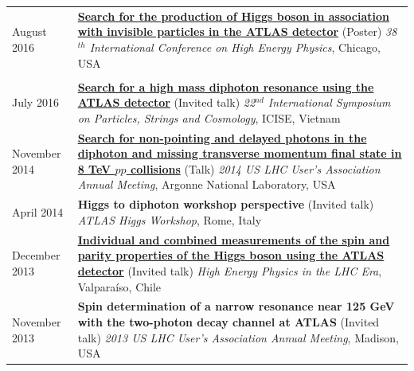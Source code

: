 \documentclass{letter}
\begin{document}
\begin{tabular}{p{}p{}}
	August 2016
	&
	\href{https://cds.cern.ch/record/2208271}{\textbf{Search for the production of Higgs boson in association with invisible particles in the ATLAS detector}} (Poster) \newline 
	\textit{38$^{th}$ International Conference on High Energy Physics}, Chicago, USA \\
\\
	July 2016
	&
	\href{https://cds.cern.ch/record/2199807}{\textbf{Search for a high mass diphoton resonance using the ATLAS detector}} (Invited talk) \newline 
	\textit{22$^{nd}$ International Symposium on Particles, Strings and Cosmology}, ICISE, Vietnam \newline
\\
	November 2014
	&
	\href{https://indico.hep.anl.gov/indico/contributionDisplay.py?contribId=39&sessionId=0&confId=410}{\textbf{Search for non-pointing and delayed photons in the diphoton and missing transverse momentum final state in 8 TeV $pp$ collisions}} (Talk) \newline
	\textit{2014 US LHC User's Association Annual Meeting}, Argonne National Laboratory, USA \newline
\\
	April 2014
	&
	\textbf{Higgs to diphoton workshop perspective} (Invited talk) \newline
	\textit{ATLAS Higgs Workshop}, Rome, Italy \newline
\\
	December 2013
	&
	\href{https://cds.cern.ch/record/1640386}{\textbf{Individual and combined measurements of the spin and parity properties of the Higgs boson using the ATLAS detector}} (Invited talk) \newline
	\textit{High Energy Physics in the LHC Era}, Valpara\'{i}so, Chile \newline
\\
	November 2013
	&
	\textbf{Spin determination of a narrow resonance near 125 GeV with the two-photon decay channel at ATLAS} (Invited talk) \newline
	\textit{2013 US LHC User's Association Annual Meeting}, Madison, USA \newline

\end{tabular}
\end{document}
